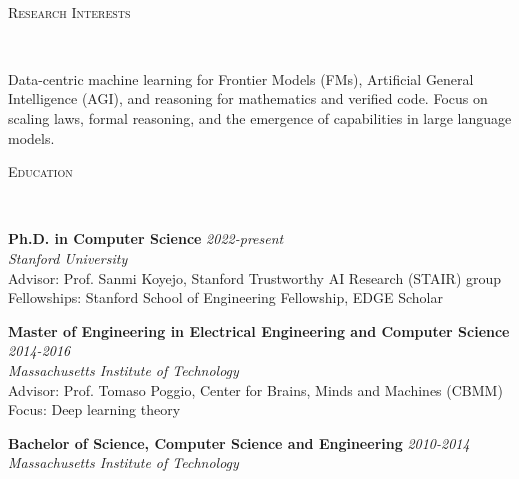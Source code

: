 \documentclass{article}
\newenvironment{changemargin}[2]{%
  \begin{list}{}{%
    \setlength{\topsep}{0pt}%
    \setlength{\leftmargin}{#1}%
    \setlength{\rightmargin}{#2}%
    \setlength{\listparindent}{\parindent}%
    \setlength{\itemindent}{\parindent}%
    \setlength{\parsep}{\parskip}%
  }%
  \item[]}{\end{list}
}
\newcommand{\lineover}{
	\begin{changemargin}{-0.05in}{-0.05in}
		\vspace*{-8pt}
		\hrulefill \\
		\vspace*{-2pt}
	\end{changemargin}
}
\newcommand{\header}[1]{
	\begin{changemargin}{-0.5in}{-0.5in}
		\scshape{#1}\\
  	\lineover
	\end{changemargin}
}
\newenvironment{body} {
	\vspace*{-16pt}
	\begin{changemargin}{-0.25in}{-0.5in}
  }	
	{\end{changemargin}
}
\begin{document}

\begin{changemargin}{-0.5in}{-0.5in}
\\ 
\vspace{10 pt}
\end{changemargin}


\header{Research Interests}

\begin{body}
	\vspace{14pt}
	Data-centric machine learning for Frontier Models (FMs), Artificial General Intelligence (AGI), and reasoning for mathematics and verified code. Focus on scaling laws, formal reasoning, and the emergence of capabilities in large language models.
\end{body}

\smallskip

\header{Education}

\begin{body}
	\vspace{14pt}
	\textbf{Ph.D. in Computer Science} \hfill \emph{2022-present}\\
	\emph{Stanford University} \hfill {}\\
	Advisor: Prof. Sanmi Koyejo, Stanford Trustworthy AI Research (STAIR) group\\
    Fellowships: Stanford School of Engineering Fellowship, EDGE Scholar
    
	\textbf{Master of Engineering in Electrical Engineering and Computer Science} \hfill \emph{2014-2016}\\
	\emph{Massachusetts Institute of Technology} \hfill {}\\
    Advisor: Prof. Tomaso Poggio, Center for Brains, Minds and Machines (CBMM)\\
    Focus: Deep learning theory
    
	\textbf{Bachelor of Science, Computer Science and Engineering} \hfill \emph{2010-2014} \\
	\emph{Massachusetts Institute of Technology} \hfill {}\\
\end{body}
\end{document}

